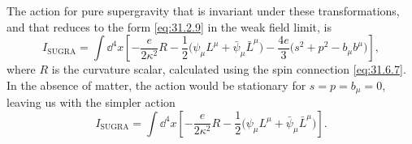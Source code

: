 The action for pure supergravity that is invariant under these
transformations, and that reduces to the form \eqref{eq:31.2.9} in the
weak field limit, is
\begin{equation}
  I_{\mathrm{SUGRA}}
  =\int \dd^4x\left[
    -\frac{e}{2\kappa^2}R
    -\frac{1}{2}\bigl(
      \psi_\mu L^\mu+\bar\psi_\mu\bar L^\mu\bigr)
    -\frac{4e}{3}\bigl(s^2+p^2-b_\mu b^\mu\bigr)
  \right],
  \tag{31.6.11}\label{eq:31.6.11}
\end{equation}
where \(R\) is the curvature scalar, calculated using the spin
connection \eqref{eq:31.6.7}. In the absence of matter, the action would
be stationary for \(s=p=b_\mu=0\), leaving us with the simpler action
\[
  I_{\mathrm{SUGRA}}
  =\int \dd^4x\left[
    -\frac{e}{2\kappa^2}R
    -\frac{1}{2}\bigl(
      \psi_\mu L^\mu+\bar\psi_\mu\bar L^\mu\bigr)
  \right].
\]

